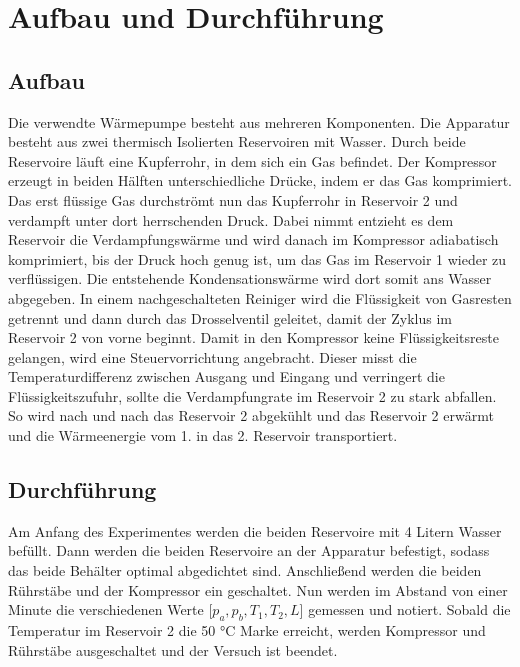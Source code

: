 \section{Aufbau und Durchführung}

\subsection{Aufbau}

Die verwendte Wärmepumpe besteht aus mehreren Komponenten. Die Apparatur besteht aus zwei thermisch Isolierten Reservoiren
mit Wasser. Durch beide Reservoire läuft eine Kupferrohr, in dem sich ein Gas befindet. Der Kompressor erzeugt in beiden Hälften
unterschiedliche Drücke, indem er das Gas komprimiert. Das erst flüssige Gas durchströmt nun das Kupferrohr in Reservoir 2 und
verdampft unter dort herrschenden Druck. Dabei nimmt entzieht es dem Reservoir die Verdampfungswärme und wird danach im Kompressor
adiabatisch komprimiert, bis der Druck hoch genug ist, um  das Gas im Reservoir 1 wieder zu verflüssigen. Die entstehende
Kondensationswärme wird dort somit ans Wasser abgegeben. In einem nachgeschalteten Reiniger wird die Flüssigkeit von Gasresten
getrennt und dann durch das Drosselventil geleitet, damit der Zyklus im Reservoir 2 von vorne beginnt. Damit in den Kompressor keine
Flüssigkeitsreste gelangen, wird eine Steuervorrichtung angebracht. Dieser misst die Temperaturdifferenz zwischen Ausgang und Eingang
und verringert die Flüssigkeitszufuhr, sollte die Verdampfungrate im Reservoir 2 zu stark abfallen. So wird nach und nach das
Reservoir 2 abgekühlt und das Reservoir 2 erwärmt und die Wärmeenergie vom 1. in das 2. Reservoir transportiert.

\subsection{Durchführung}

Am Anfang des Experimentes werden die beiden Reservoire mit 4 Litern Wasser befüllt. Dann werden die beiden Reservoire an der Apparatur
befestigt, sodass das beide Behälter optimal abgedichtet sind. Anschließend werden die beiden Rührstäbe und der Kompressor
ein geschaltet. Nun werden im Abstand von einer Minute die verschiedenen Werte [$p_a, p_b, T_1, T_2, L$] gemessen und notiert. Sobald
die Temperatur im Reservoir 2 die 50 °C Marke erreicht, werden Kompressor und Rührstäbe ausgeschaltet und der Versuch ist beendet.







